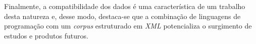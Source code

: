 \documentclass[portuguese]{textolivre}
\begin{document}
Finalmente, a compatibilidade dos dados é uma característica de um trabalho desta natureza e, desse modo, destaca-se que a combinação de linguagens de programação com um \emph{corpus} estruturado em \emph{XML} potencializa o surgimento de estudos e produtos futuros.









\printbibliography\label{sec-bib}
\end{document}
